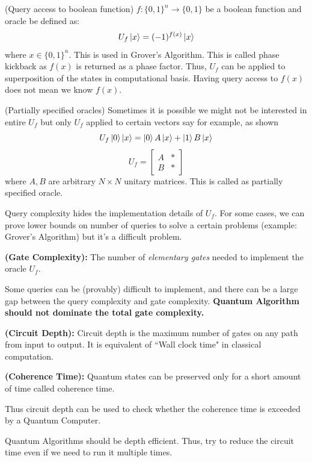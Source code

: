 \begin{example}
    (Query access to boolean function) $f:\{0,1\}^n \rightarrow \{0,1\}$ be a boolean function and oracle be defined as:
    \[ U_f\ket{x}=(-1)^{f(x)}\ket{x} \]
    where $x \in \{0,1\}^n$. This is used in Grover's Algorithm. This is called phase kickback as $f(x)$ is returned as a phase factor.
    Thus, $U_f$ can be applied to superposition of the states in computational basis.
    Having query access to $f(x)$ does not mean we know $f(x)$.
\end{example}
\begin{example}
    (Partially specified oracles) Sometimes it is possible we might not be interested in entire $U_f$ but only $U_f$ applied to certain vectors
    say for example, as shown
    \[ U_f\ket{0}\ket{x}=\ket{0}A\ket{x}+\ket{1}B\ket{x}\]
    \[U_f=\begin{bmatrix} A & * \\ B & * \end{bmatrix}\]
    where $A,B$ are arbitrary $ N \times N$ unitary matrices. This is called as partially specified oracle.
\end{example}

Query complexity hides the implementation details of $U_f$. For some cases, we can prove lower bounds on number of queries to solve a certain problems (example: Grover's Algorithm) but it's a difficult problem. 
\begin{definition}
    \textbf{(Gate Complexity):} The number of \textit{elementary gates} needed to implement the oracle $U_f$.
\end{definition}
Some queries can be (provably) difficult to implement, and there can be a large gap between the query complexity and gate complexity. \textbf{Quantum Algorithm should not dominate the total gate complexity.}
\begin{definition}
    \textbf{(Circuit Depth):}
    Circuit depth is the maximum number of gates on any path from input to output. It is equivalent of ``Wall clock time" in classical computation.
\end{definition} 

\begin{definition}
    \textbf{(Coherence Time):} Quantum states can be preserved only for a short amount of time called coherence time.
\end{definition}
Thus circuit depth can be used to check whether the coherence time is exceeded by a Quantum Computer.

Quantum Algorithms should be depth efficient. Thus, try to reduce the circuit time even if we need to run it multiple times.

